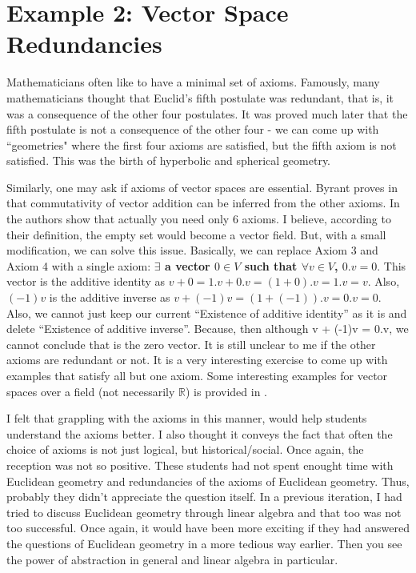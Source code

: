 \documentclass[12pt]{amsart}
\begin{document}
\section{Example 2: Vector Space Redundancies}
Mathematicians often like to have a minimal set of axioms.  Famously, many mathematicians thought that Euclid's fifth postulate was redundant, that is, it was a consequence of the other four postulates.  It was proved much later that the fifth postulate is not a consequence of the other four - we can come up with ``geometries" where the first four axioms are satisfied, but the fifth axiom is not satisfied.  This was the birth of hyperbolic and spherical geometry.  

Similarly, one may ask if axioms of vector spaces are essential.  Byrant proves in \cite{Bryant} that commutativity of vector addition can be inferred from the other axioms.  In \cite{Rigby-Wiegold} the authors show that actually you need only $6$ axioms.  I believe, according to their definition, the empty set would become a vector field.  But, with a small modification, we can solve this issue.  Basically, we can replace Axiom 3 and Axiom 4 with a single axiom: \textbf{$\exists$ a vector $0\in V$ such that $\forall v\in V$, $0.v = 0$}.  This vector is the additive identity as $v+0 = 1.v + 0.v = (1+0).v = 1.v = v$.  Also, $(-1)v$ is the additive inverse as $v + (-1)v = (1+(-1)).v = 0.v = 0$.  Also, we cannot just keep our current “Existence of additive identity” as it is and delete “Existence of additive inverse”.  Because, then although v + (-1)v = 0.v, we cannot conclude that is the zero vector.  It is still unclear to me if the other axioms are redundant or not.  It is a very interesting exercise to come up with examples that satisfy all but one axiom.  Some interesting examples for vector spaces over a field (not necessarily $\mathbb{R}$) is provided in \cite{user7530}.

I felt that grappling with the axioms in this manner, would help students understand the axioms better.  I also thought it conveys the fact that often the choice of axioms is not just logical, but historical/social.  Once again, the reception was not so positive.  These students had not spent enought time with Euclidean geometry and redundancies of the axioms of Euclidean geometry.  Thus, probably they didn't appreciate the question itself.  In a previous iteration, I had tried to discuss Euclidean geometry through linear algebra and that too was not too successful.  Once again, it would have been more exciting if they had answered the questions of Euclidean geometry in a more tedious way earlier.  Then you see the power of abstraction in general and linear algebra in particular.  
\end{document}
